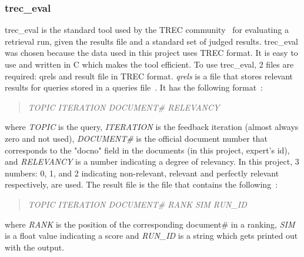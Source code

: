 \subsubsection{trec\_eval}\label{sec:treceval}
trec\_eval is the standard tool used by the TREC community~\cite{trec} for evaluating a retrieval run, given the results file and a
standard set of judged results. trec\_eval was chosen because the data used in this project uses TREC format. 
It is easy to use and written in C which makes the tool efficient. To use trec\_eval, 2 files are required: qrels and result file in TREC format.
\textit{qrels} is a file that stores relevant results for queries stored in a queries file~\cite{qrels}. It has the following format~\cite{qrelsformat}:
\begin{quotation}
 \textit{TOPIC ITERATION DOCUMENT\# RELEVANCY}
\end{quotation}
where \textit{TOPIC} is the query, \textit{ITERATION} is the feedback iteration (almost always zero and not used),
\textit{DOCUMENT\#} is the official document number that corresponds to the "docno" field in the documents (in this project, expert's id), and
\textit{RELEVANCY} is a number indicating a degree of relevancy. In this project, 3 numbers: 0, 1, and 2 indicating non-relevant, relevant and perfectly
relevant respectively, are used. The result file is the file that contains the following~\cite{resultfileformat}:
\begin{quotation}
 \textit{TOPIC ITERATION DOCUMENT\# RANK SIM RUN\_ID}
\end{quotation}
where \textit{RANK} is the position of the corresponding document\# in a ranking, \textit{SIM} is a float value indicating a score and \textit{RUN\_ID}
is a string which gets printed out with the output.



